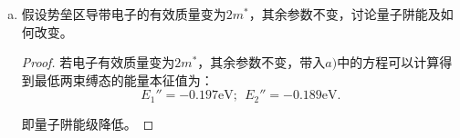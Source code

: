 \documentclass[reqno,a4paper,12pt]{amsart}
\begin{document}
\begin{enumerate}[a)]
\begin{proof}
即势阱宽度减小到$5.30\text{nm}$时，该量子阱只允许一个束缚态存在。
\end{proof}

\item 假设势垒区导带电子的有效质量变为$2m^*$，其余参数不变，讨论量子阱能及如何改变。

\begin{proof}
若电子有效质量变为$2m^*$，其余参数不变，带入$a)$中的方程可以计算得到最低两束缚态的能量本征值为：
\[
	E_1'' = -0.197\text{eV}; \ \ E_2'' = -0.189\text{eV}.
\]

即量子阱能级降低。
\end{proof}

\end{enumerate}
\end{document}
